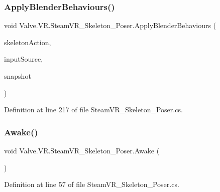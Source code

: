 \subsubsection{\texorpdfstring{ApplyBlenderBehaviours()}{ApplyBlenderBehaviours()}}
{\footnotesize\ttfamily void Valve.\+V\+R.\+Steam\+V\+R\+\_\+\+Skeleton\+\_\+\+Poser.\+Apply\+Blender\+Behaviours (\begin{DoxyParamCaption}\item[{\mbox{\hyperlink{class_valve_1_1_v_r_1_1_steam_v_r___action___skeleton}{Steam\+V\+R\+\_\+\+Action\+\_\+\+Skeleton}}}]{skeleton\+Action,  }\item[{\mbox{\hyperlink{namespace_valve_1_1_v_r_a82e5bf501cc3aa155444ee3f0662853f}{Steam\+V\+R\+\_\+\+Input\+\_\+\+Sources}}}]{input\+Source,  }\item[{\mbox{\hyperlink{class_valve_1_1_v_r_1_1_steam_v_r___skeleton___pose_snapshot}{Steam\+V\+R\+\_\+\+Skeleton\+\_\+\+Pose\+Snapshot}}}]{snapshot }\end{DoxyParamCaption})\hspace{0.3cm}{\ttfamily [protected]}}



Definition at line 217 of file Steam\+V\+R\+\_\+\+Skeleton\+\_\+\+Poser.\+cs.

\mbox{\label{class_valve_1_1_v_r_1_1_steam_v_r___skeleton___poser_a814dc0d682cf294b1a81f41a4ae64f74}} 
\subsubsection{\texorpdfstring{Awake()}{Awake()}}
{\footnotesize\ttfamily void Valve.\+V\+R.\+Steam\+V\+R\+\_\+\+Skeleton\+\_\+\+Poser.\+Awake (\begin{DoxyParamCaption}{ }\end{DoxyParamCaption})\hspace{0.3cm}{\ttfamily [protected]}}



Definition at line 57 of file Steam\+V\+R\+\_\+\+Skeleton\+\_\+\+Poser.\+cs.

\mbox{\label{class_valve_1_1_v_r_1_1_steam_v_r___skeleton___poser_a512976b6887ba7727cdf155de454c467}} 
